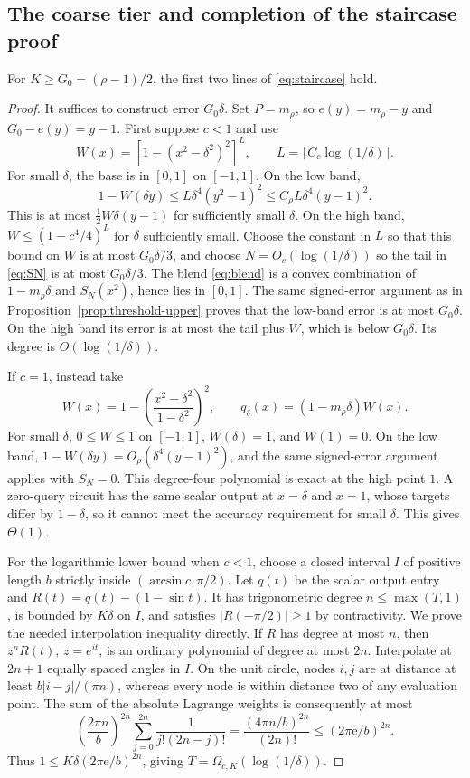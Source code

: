 \subsection{The coarse tier and completion of the staircase proof}
\begin{proposition}\label{prop:coarse}
For $K\geq G_0=(\rho-1)/2$, the first two lines of \eqref{eq:staircase} hold.
\end{proposition}
\begin{proof}
It suffices to construct error $G_0\delta$. Set $P=m_\rho$, so $e(y)=m_\rho-y$ and $G_0-e(y)=y-1$. First suppose $c<1$ and use
\[
 W(x)=[1-(x^2-\delta^2)^2]^L,\qquad
 L=\lceil C_c\log(1/\delta)\rceil.
\]
For small $\delta$, the base is in $[0,1]$ on $[-1,1]$. On the low band,
\[
 1-W(\delta y)\leq L\delta^4(y^2-1)^2
 \leq C_\rho L\delta^4(y-1)^2.
\]
This is at most $\tfrac12W\delta(y-1)$ for sufficiently small $\delta$. On the high band, $W\leq(1-c^4/4)^L$ for $\delta$ sufficiently small. Choose the constant in $L$ so that this bound on $W$ is at most $G_0\delta/3$, and choose $N=O_c(\log(1/\delta))$ so the tail in \eqref{eq:SN} is at most $G_0\delta/3$. The blend \eqref{eq:blend} is a convex combination of $1-m_\rho\delta$ and $S_N(x^2)$, hence lies in $[0,1]$. The same signed-error argument as in Proposition~\ref{prop:threshold-upper} proves that the low-band error is at most $G_0\delta$. On the high band its error is at most the tail plus $W$, which is below $G_0\delta$. Its degree is $O(\log(1/\delta))$.

If $c=1$, instead take
\[
 W(x)=1-\left(\frac{x^2-\delta^2}{1-\delta^2}\right)^2,
 \qquad q_\delta(x)=(1-m_\rho\delta)W(x).
\]
For small $\delta$, $0\leq W\leq1$ on $[-1,1]$, $W(\delta)=1$, and $W(1)=0$. On the low band, $1-W(\delta y)=O_\rho(\delta^4(y-1)^2)$, and the same signed-error argument applies with $S_N=0$. This degree-four polynomial is exact at the high point $1$. A zero-query circuit has the same scalar output at $x=\delta$ and $x=1$, whose targets differ by $1-\delta$, so it cannot meet the accuracy requirement for small $\delta$. This gives $\Theta(1)$.

For the logarithmic lower bound when $c<1$, choose a closed interval $I$ of positive length $b$ strictly inside $(\arcsin c,\pi/2)$. Let $q(t)$ be the scalar output entry and $R(t)=q(t)-(1-\sin t)$. It has trigonometric degree $n\leq\max(T,1)$, is bounded by $K\delta$ on $I$, and satisfies $|R(-\pi/2)|\geq1$ by contractivity. We prove the needed interpolation inequality directly. If $R$ has degree at most $n$, then $z^nR(t)$, $z=e^{it}$, is an ordinary polynomial of degree at most $2n$. Interpolate at $2n+1$ equally spaced angles in $I$. On the unit circle, nodes $i,j$ are at distance at least $b|i-j|/(\pi n)$, whereas every node is within distance two of any evaluation point. The sum of the absolute Lagrange weights is consequently at most
\[
 \left(\frac{2\pi n}{b}\right)^{2n}
 \sum_{j=0}^{2n}\frac1{j!(2n-j)!}
 =\frac{(4\pi n/b)^{2n}}{(2n)!}
 \leq(2\pi\mathrm e/b)^{2n}.
\]
Thus $1\leq K\delta(2\pi\mathrm e/b)^{2n}$, giving $T=\Omega_{c,K}(\log(1/\delta))$.
\end{proof}
